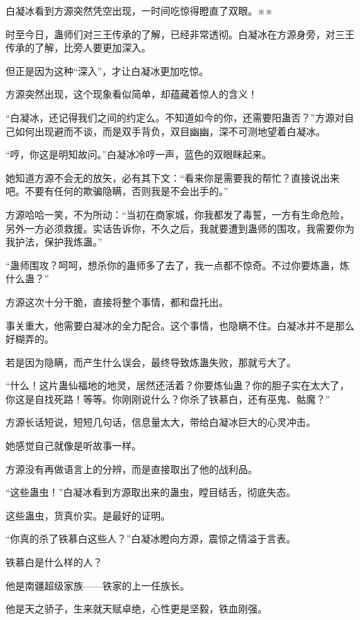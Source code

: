 
\begin{this_body}

白凝冰看到方源突然凭空出现，一时间吃惊得瞪直了双眼。※※

时至今日，蛊师们对三王传承的了解，已经非常透彻。白凝冰在方源身旁，对三王传承的了解，比旁人要更加深入。

但正是因为这种“深入”，才让白凝冰更加吃惊。

方源突然出现，这个现象看似简单，却蕴藏着惊人的含义！

“白凝冰，还记得我们之间的约定么。不知道如今的你，还需要阳蛊否？”方源对自己如何出现避而不谈，而是双手背负，双目幽幽，深不可测地望着白凝冰。

“哼，你这是明知故问。”白凝冰冷哼一声，蓝色的双眼眯起来。

她知道方源不会无的放矢，必有其下文：“看来你是需要我的帮忙？直接说出来吧。不要有任何的欺骗隐瞒，否则我是不会出手的。”

方源哈哈一笑，不为所动：“当初在商家城，你我都发了毒誓，一方有生命危险，另外一方必须救援。实话告诉你，不久之后，我就要遭到蛊师的围攻，我需要你为我护法，保护我炼蛊。”

“蛊师围攻？呵呵，想杀你的蛊师多了去了，我一点都不惊奇。不过你要炼蛊，炼什么蛊？”

方源这次十分干脆，直接将整个事情，都和盘托出。

事关重大，他需要白凝冰的全力配合。这个事情，也隐瞒不住。白凝冰并不是那么好糊弄的。

若是因为隐瞒，而产生什么误会，最终导致炼蛊失败，那就亏大了。

“什么！这片蛊仙福地的地灵，居然还活着？你要炼仙蛊？你的胆子实在太大了，你这是自找死路！等等。你刚刚说什么？你杀了铁慕白，还有巫鬼、骷魔？”

方源长话短说，短短几句话，信息量太大，带给白凝冰巨大的心灵冲击。

她感觉自己就像是听故事一样。

方源没有再做语言上的分辨，而是直接取出了他的战利品。

“这些蛊虫！”白凝冰看到方源取出来的蛊虫，瞠目结舌，彻底失态。

这些蛊虫，货真价实。是最好的证明。

“你真的杀了铁慕白这些人？”白凝冰瞪向方源，震惊之情溢于言表。

铁慕白是什么样的人？

他是南疆超级家族——铁家的上一任族长。

他是天之骄子，生来就天赋卓绝，心性更是坚毅，铁血刚强。


\end{this_body}

